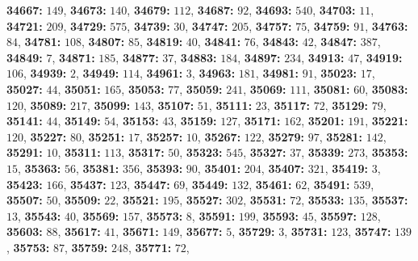 \textsf{\bfseries 34667:} $149$, \textsf{\bfseries 34673:} $140$, \textsf{\bfseries 34679:} $112$, \textsf{\bfseries 34687:} $92$, \textsf{\bfseries 34693:} $540$, \textsf{\bfseries 34703:} $11$, \textsf{\bfseries 34721:} $209$, \textsf{\bfseries 34729:} $575$, \textsf{\bfseries 34739:} $30$, \textsf{\bfseries 34747:} $205$, \textsf{\bfseries 34757:} $75$, \textsf{\bfseries 34759:} $91$, \textsf{\bfseries 34763:} $84$, \textsf{\bfseries 34781:} $108$, \textsf{\bfseries 34807:} $85$, \textsf{\bfseries 34819:} $40$, \textsf{\bfseries 34841:} $76$, \textsf{\bfseries 34843:} $42$, \textsf{\bfseries 34847:} $387$, \textsf{\bfseries 34849:} $7$, \textsf{\bfseries 34871:} $185$, \textsf{\bfseries 34877:} $37$, \textsf{\bfseries 34883:} $184$, \textsf{\bfseries 34897:} $234$, \textsf{\bfseries 34913:} $47$, \textsf{\bfseries 34919:} $106$, \textsf{\bfseries 34939:} $2$, \textsf{\bfseries 34949:} $114$, \textsf{\bfseries 34961:} $3$, \textsf{\bfseries 34963:} $181$, \textsf{\bfseries 34981:} $91$, \textsf{\bfseries 35023:} $17$, \textsf{\bfseries 35027:} $44$, \textsf{\bfseries 35051:} $165$, \textsf{\bfseries 35053:} $77$, \textsf{\bfseries 35059:} $241$, \textsf{\bfseries 35069:} $111$, \textsf{\bfseries 35081:} $60$, \textsf{\bfseries 35083:} $120$, \textsf{\bfseries 35089:} $217$, \textsf{\bfseries 35099:} $143$, \textsf{\bfseries 35107:} $51$, \textsf{\bfseries 35111:} $23$, \textsf{\bfseries 35117:} $72$, \textsf{\bfseries 35129:} $79$, \textsf{\bfseries 35141:} $44$, \textsf{\bfseries 35149:} $54$, \textsf{\bfseries 35153:} $43$, \textsf{\bfseries 35159:} $127$, \textsf{\bfseries 35171:} $162$, \textsf{\bfseries 35201:} $191$, \textsf{\bfseries 35221:} $120$, \textsf{\bfseries 35227:} $80$, \textsf{\bfseries 35251:} $17$, \textsf{\bfseries 35257:} $10$, \textsf{\bfseries 35267:} $122$, \textsf{\bfseries 35279:} $97$, \textsf{\bfseries 35281:} $142$, \textsf{\bfseries 35291:} $10$, \textsf{\bfseries 35311:} $113$, \textsf{\bfseries 35317:} $50$, \textsf{\bfseries 35323:} $545$, \textsf{\bfseries 35327:} $37$, \textsf{\bfseries 35339:} $273$, \textsf{\bfseries 35353:} $15$, \textsf{\bfseries 35363:} $56$, \textsf{\bfseries 35381:} $356$, \textsf{\bfseries 35393:} $90$, \textsf{\bfseries 35401:} $204$, \textsf{\bfseries 35407:} $321$, \textsf{\bfseries 35419:} $3$, \textsf{\bfseries 35423:} $166$, \textsf{\bfseries 35437:} $123$, \textsf{\bfseries 35447:} $69$, \textsf{\bfseries 35449:} $132$, \textsf{\bfseries 35461:} $62$, \textsf{\bfseries 35491:} $539$, \textsf{\bfseries 35507:} $50$, \textsf{\bfseries 35509:} $22$, \textsf{\bfseries 35521:} $195$, \textsf{\bfseries 35527:} $302$, \textsf{\bfseries 35531:} $72$, \textsf{\bfseries 35533:} $135$, \textsf{\bfseries 35537:} $13$, \textsf{\bfseries 35543:} $40$, \textsf{\bfseries 35569:} $157$, \textsf{\bfseries 35573:} $8$, \textsf{\bfseries 35591:} $199$, \textsf{\bfseries 35593:} $45$, \textsf{\bfseries 35597:} $128$, \textsf{\bfseries 35603:} $88$, \textsf{\bfseries 35617:} $41$, \textsf{\bfseries 35671:} $149$, \textsf{\bfseries 35677:} $5$, \textsf{\bfseries 35729:} $3$, \textsf{\bfseries 35731:} $123$, \textsf{\bfseries 35747:} $139$, \textsf{\bfseries 35753:} $87$, \textsf{\bfseries 35759:} $248$, \textsf{\bfseries 35771:} $72$, 

